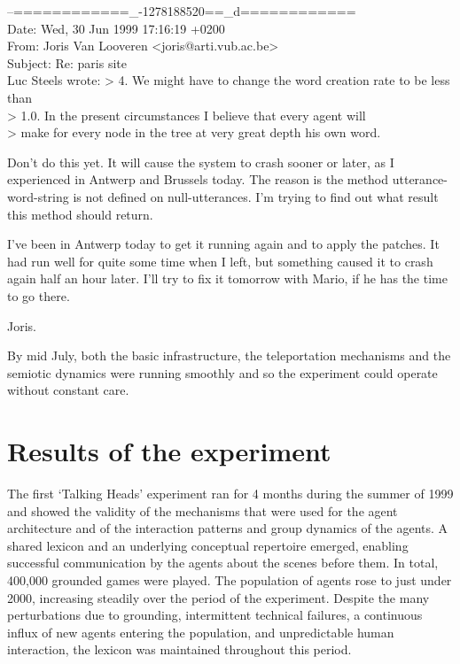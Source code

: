 \begin{mail}
--============\_-1278188520==\_d============\\
Date: Wed, 30 Jun 1999 17:16:19 +0200\\
From: Joris Van Looveren <joris@arti.vub.ac.be>\\
Subject: Re: paris site\\

Luc Steels wrote:
> 4. We might have to change the word creation rate to be less than 
\\> 1.0. In the present circumstances I believe that every agent will 
\\> make for every node in the tree at very great depth his own word.

Don't do this yet. It will cause the system to crash sooner or later, as
I experienced in Antwerp and Brussels today. The reason is the method
utterance-word-string is not defined on null-utterances. I'm trying to
find out what result this method should return.

I've been in Antwerp today to get it running again and to apply the
patches. It had run well for quite some time when I left, but something
caused it to crash again half an hour later. I'll try to fix it tomorrow
with Mario, if he has the time to go there.

Joris.
\end{mail}


By mid July, both the basic infrastructure, the teleportation mechanisms and the semiotic dynamics were running 
smoothly and so the experiment could operate without constant care. 

\section{Results of the experiment}

The first `Talking Heads' experiment ran for 4 months during the summer of 1999 and showed the validity of the mechanisms that were used for the agent architecture and of the interaction patterns and group dynamics of the agents. A shared lexicon and an underlying conceptual repertoire emerged, enabling successful communication by the agents about the scenes before them. In total, 400,000 grounded games were played. The population of agents rose to just under 2000, increasing steadily over the period of the experiment. Despite the many perturbations due to grounding, intermittent technical failures, a continuous influx of new agents entering the population, and unpredictable human interaction, the lexicon was maintained throughout this period.

